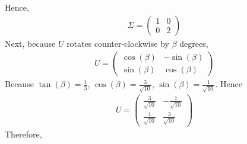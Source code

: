 \documentclass{article}
\begin{document}
        Hence,
        \begin{align*}
            \Sigma = \begin{pmatrix}
                1 &0\\
                0 &2
            \end{pmatrix}
        \end{align*}
        Next, because $U$ rotates counter-clockwise by $\beta$ degrees,
        \begin{align*}
            U
            =\begin{pmatrix}
                \cos(\beta) &-\sin(\beta)\\
                \sin(\beta) &\cos(\beta)
            \end{pmatrix}
        \end{align*}
        Because $\tan(\beta)=\frac{1}{3}$, $\cos(\beta)=\frac{3}{\sqrt{10}}$, $\sin(\beta)=\frac{1}{\sqrt{10}}$. Hence
        \begin{align*}
            U=
            \begin{pmatrix}
                \frac{3}{\sqrt{10}} &-\frac{1}{\sqrt{10}}\\
                \frac{1}{\sqrt{10}} &\frac{3}{\sqrt{10}}
            \end{pmatrix}
        \end{align*}
        Therefore, 
\end{document}
